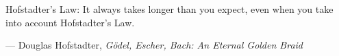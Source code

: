 Hofstadter's Law: It always takes longer than you expect, even when you take into account Hofstadter's Law.

— Douglas Hofstadter, \textit{G{\"o}del, Escher, Bach: An Eternal Golden Braid}
